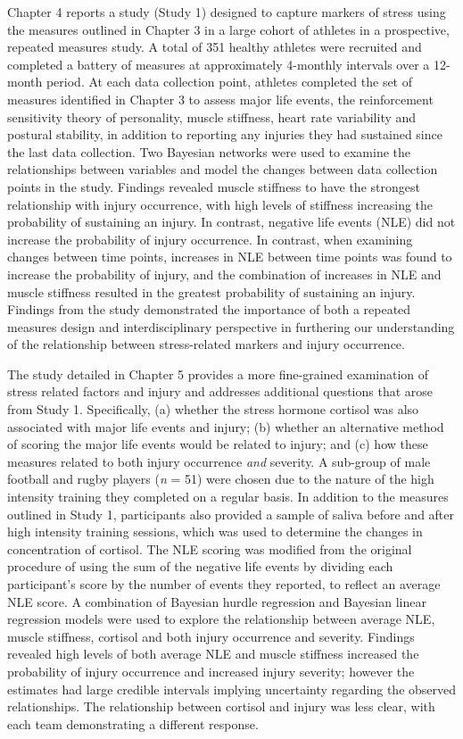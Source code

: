 \documentclass[man,floatsintext]{apa6}
\begin{document}
Chapter 4 reports a study (Study 1) designed to capture markers of stress using the measures outlined in Chapter 3 in a large cohort of athletes in a prospective, repeated measures study.
A total of 351 healthy athletes were recruited and completed a battery of measures at approximately 4-monthly intervals over a 12-month period.
At each data collection point, athletes completed the set of measures identified in Chapter 3 to assess major life events, the reinforcement sensitivity theory of personality, muscle stiffness, heart rate variability and postural stability, in addition to reporting any injuries they had sustained since the last data collection.
Two Bayesian networks were used to examine the relationships between variables and model the changes between data collection points in the study.
Findings revealed muscle stiffness to have the strongest relationship with injury occurrence, with high levels of stiffness increasing the probability of sustaining an injury.
In contrast, negative life events (NLE) did not increase the probability of injury occurrence. In contrast, when examining changes between time points, increases in NLE between time points was found to increase the probability of injury, and the combination of increases in NLE and muscle stiffness resulted in the greatest probability of sustaining an injury.
Findings from the study demonstrated the importance of both a repeated measures design and interdisciplinary perspective in furthering our understanding of the relationship between stress-related markers and injury occurrence.

The study detailed in Chapter 5 provides a more fine-grained examination of stress related factors and injury and addresses additional questions that arose from Study 1.
Specifically,
(a) whether the stress hormone cortisol was also associated with major life events and injury;
(b) whether an alternative method of scoring the major life events would be related to injury; and
(c) how these measures related to both injury occurrence \emph{and} severity.
A sub-group of male football and rugby players (\emph{n} = 51) were chosen due to the nature of the high intensity training they completed on a regular basis.
In addition to the measures outlined in Study 1, participants also provided a sample of saliva before and after high intensity training sessions, which was used to determine the changes in concentration of cortisol.
The NLE scoring was modified from the original procedure of using the sum of the negative life events by dividing each participant's score by the number of events they reported, to reflect an average NLE score.
A combination of Bayesian hurdle regression and Bayesian linear regression models were used to explore the relationship between average NLE, muscle stiffness, cortisol and both injury occurrence and severity.
Findings revealed high levels of both average NLE and muscle stiffness increased the probability of injury occurrence and increased injury severity; however the estimates had large credible intervals implying uncertainty regarding the observed relationships.
The relationship between cortisol and injury was less clear, with each team demonstrating a different response.
\end{document}

